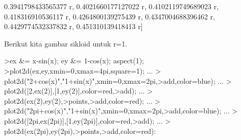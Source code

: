 \documentclass[a4paper,10pt]{article}
\begin{document}
\begin{eulernotebook}
\begin{eulercomment}
\begin{eulercomment}
\begin{eulercomment}
\begin{eulercomment}
\begin{eulercomment}
\begin{eulercomment}
\begin{eulercomment}
\begin{eulercomment}
\begin{eulercomment}
\begin{eulercomment}
\begin{eulercomment}
\begin{eulercomment}
\begin{eulercomment}
\begin{eulercomment}
\begin{eulercomment}
\begin{eulercomment}
\begin{eulercomment}
\begin{eulercomment}
\begin{eulercomment}
\begin{eulercomment}
\begin{euleroutput}
  0.3941798433565377 r, 0.4021660177127022 r, 0.4102119749689023 r, 
  0.418316910536117 r, 0.4264800139275439 r, 0.4347004688396462 r, 
  0.4429774532337832 r, 0.451310139418413 r]
  
\end{euleroutput}
\begin{eulercomment}
Berikut kita gambar sikloid untuk r=1.
\end{eulercomment}
\begin{eulerprompt}
>ex &= x-sin(x); ey &= 1-cos(x); aspect(1);
>plot2d(ex,ey,xmin=0,xmax=4pi,square=1); ...
>  plot2d("2+cos(x)","1+sin(x)",xmin=0,xmax=2pi,>add,color=blue); ...
>  plot2d([2,ex(2)],[1,ey(2)],color=red,>add); ...
>  plot2d(ex(2),ey(2),>points,>add,color=red); ...
>  plot2d("2pi+cos(x)","1+sin(x)",xmin=0,xmax=2pi,>add,color=blue); ...
>  plot2d([2pi,ex(2pi)],[1,ey(2pi)],color=red,>add);  ...
>  plot2d(ex(2pi),ey(2pi),>points,>add,color=red):
\end{eulerprompt}
\begin{euleroutput}

\end{euleroutput}
\end{eulercomment}
\end{eulercomment}
\end{eulercomment}
\end{eulercomment}
\end{eulercomment}
\end{eulercomment}
\end{eulercomment}
\end{eulercomment}
\end{eulercomment}
\end{eulercomment}
\end{eulercomment}
\end{eulercomment}
\end{eulercomment}
\end{eulercomment}
\end{eulercomment}
\end{eulercomment}
\end{eulercomment}
\end{eulercomment}
\end{eulercomment}
\end{eulercomment}
\end{eulernotebook}
\end{document}
